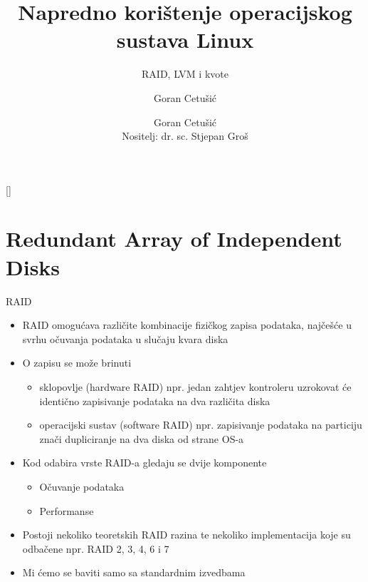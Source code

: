 \documentclass[croatian,t]{beamer} %
\title[NKOSL]{Napredno korištenje operacijskog sustava Linux}
\subtitle{RAID, LVM i kvote}
\author{Goran Cetušić}
\author[Goran Cetušić]{Goran Cetušić\\{\small Nositelj: dr. sc. Stjepan Groš}}
\institute[FER]{Sveučilište u Zagrebu \\
				Fakultet elektrotehnike i računarstva}
\date{\todayiso}
\begin{document}
    {
    [] %
    \begin{frame}
        \maketitle
    \end{frame}
    }
    
    \begin{frame}
        \tableofcontents
    \end{frame}
    
    \section{Redundant Array of Independent Disks}
	\begin{frame}{RAID}
		\begin{itemize}
			\item RAID omogućava različite kombinacije fizičkog zapisa podataka, najčešće u svrhu očuvanja podataka u slučaju kvara diska
			\item O zapisu se može brinuti
			\begin{itemize}
				\item sklopovlje (hardware RAID) npr. jedan zahtjev kontroleru uzrokovat će identično zapisivanje podataka na dva različita diska
				\item operacijski sustav (software RAID) npr. zapisivanje podataka na particiju znači dupliciranje na dva diska od strane OS-a
			\end{itemize}
			\item Kod odabira vrste RAID-a gledaju se dvije komponente
				\begin{itemize}
					\item Očuvanje podataka
					\item Performanse
				\end{itemize}
			\item Postoji nekoliko teoretskih RAID razina te nekoliko implementacija koje su odbačene npr. RAID 2, 3, 4, 6 i 7
			\item Mi ćemo se baviti samo sa standardnim izvedbama
		\end{itemize}
	\end{frame}    
    
\end{document}
